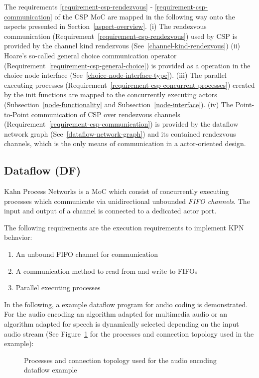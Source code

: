The requirements \ref{requirement-csp-rendezvous} -
\ref{requirement-csp-communication} of the CSP MoC are mapped in the following way
onto the aspects presented in Section~\ref{aspect-overview}.
(i) The rendezvous communication (Requirement~\ref{requirement-csp-rendezvous})
used by CSP is provided by the channel kind rendezvous (See~\ref{channel-kind-rendezvous})
(ii) Hoare's so-called general choice communication operator (Requirement~\ref{requirement-csp-general-choice})
is provided as a operation in the choice node interface (See~\ref{choice-node-interface-type}).
(iii) The parallel executing processes (Requirement~\ref{requirement-csp-concurrent-processes})
created by the init functions are mapped to the concurrently executing actors
(Subsection~\ref{node-functionality} and Subsection~\ref{node-interface}).
(iv) The Point-to-Point communication of CSP over rendezvous channels (Requirement~\ref{requirement-csp-communication})
is provided by the dataflow network graph (See~\ref{dataflow-network-graph}) and
its contained rendezvous channels, which is the only means of communication in a
actor-oriented design.

\subsection{Dataflow (DF)}
Kahn Process Networks \cite{kahn:1974}
is a MoC which consist of concurrently executing processes
which communicate via unidirectional unbounded \emph{FIFO channels}.
The input and output of a channel is connected to a dedicated
actor port.

The following requirements are the execution requirements to
implement KPN behavior:

\begin{enumerate}
\item An unbound FIFO channel for communication
\item A communication method to read from and write to FIFOs
\item Parallel executing processes
\end{enumerate}

In the following, a example dataflow program for audio coding
is demonstrated. For the audio encoding an algorithm
adapted for multimedia audio or an algorithm adapted for speech
is dynamically selected depending on the input audio stream
(See Figure~\ref{fig:media-speech-audio-coding}
for the processes and connection topology used in the example):

\begin{figure}[h]
\centering

\caption{Processes and connection topology used for the audio encoding dataflow example}
\label{fig:media-speech-audio-coding}
\end{figure}



